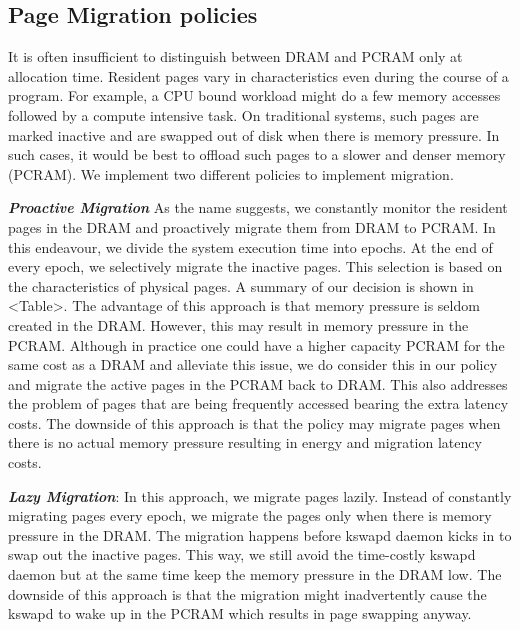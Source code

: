 \documentclass[a4paper, 11pt, conference]{ieeeconf}      %
\begin{document}
\subsection{Page Migration policies} \vspace{1mm}
It is often insufficient  to distinguish between DRAM and PCRAM only at allocation time. Resident pages vary in characteristics even during the course of a program. For example, a CPU bound workload might do a few memory accesses followed by a  compute intensive task. On traditional systems, such pages are marked inactive and are swapped out of disk when there is memory pressure.  In such cases, it would be best to offload such pages to a slower and denser memory (PCRAM). We implement two different policies to implement migration.

\vspace{1mm}

\textit{\textbf{Proactive Migration}}
As the name suggests, we constantly monitor the resident pages in the DRAM and proactively migrate them from DRAM to PCRAM. In this endeavour, we divide the system execution time into epochs. At the end of every epoch, we selectively migrate the inactive pages. This selection is based on the characteristics of physical pages. A summary of our decision is shown in <Table>. The advantage of this approach is that memory pressure is seldom created in the DRAM. However, this may result in memory pressure in the PCRAM. Although in practice one could have a higher capacity PCRAM for the same cost as a DRAM and alleviate this issue, we do consider this in our policy and migrate the active pages in the PCRAM back to DRAM. This also addresses the problem of pages that are being frequently accessed bearing the extra latency costs. The downside of this approach is that the policy may migrate pages when there is no actual memory pressure resulting in energy and migration latency costs.

\textit{\textbf{Lazy Migration}}:
In this approach, we migrate pages lazily. Instead of constantly migrating pages every epoch, we migrate the pages only when there is memory pressure in the DRAM. The migration happens before kswapd daemon kicks in to swap out the inactive pages. This way, we still avoid the time-costly kswapd daemon but at the same time keep the memory pressure in the DRAM low. The downside of this approach is that the migration might inadvertently cause the kswapd to wake up in the PCRAM which results in page swapping anyway.
\end{document}
